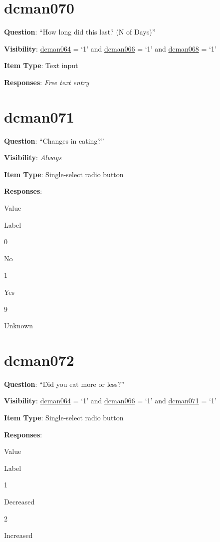\documentclass[]{book}
\begin{document}
\hypertarget{dcman070}{%
\section{dcman070}\label{dcman070}}

\textbf{Question}: ``How long did this last? (N of Days)''

\textbf{Visibility}: \protect\hyperlink{dcman064}{dcman064} = `1' and \protect\hyperlink{dcman066}{dcman066} = `1' and \protect\hyperlink{dcman068}{dcman068} = `1'

\textbf{Item Type}: Text input

\textbf{Responses}: \emph{Free text entry}

\hypertarget{dcman071}{%
\section{dcman071}\label{dcman071}}

\textbf{Question}: ``Changes in eating?''

\textbf{Visibility}: \emph{Always}

\textbf{Item Type}: Single-select radio button

\textbf{Responses}:

Value

Label

0

No

1

Yes

9

Unknown

\hypertarget{dcman072}{%
\section{dcman072}\label{dcman072}}

\textbf{Question}: ``Did you eat more or less?''

\textbf{Visibility}: \protect\hyperlink{dcman064}{dcman064} = `1' and \protect\hyperlink{dcman066}{dcman066} = `1' and \protect\hyperlink{dcman071}{dcman071} = `1'

\textbf{Item Type}: Single-select radio button

\textbf{Responses}:

Value

Label

1

Decreased

2

Increased
\end{document}
